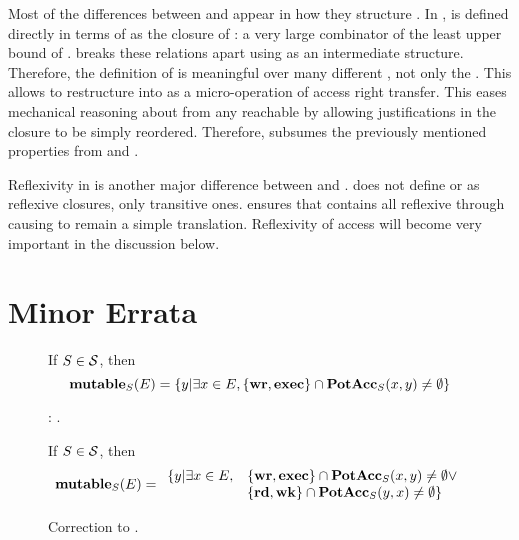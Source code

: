 Most of the differences between \TMmodelName{} and \TMSW{} appear in how they structure \TMpotAcc{}.
In \TMSW{}, \potacc{} is defined directly in terms of \diracc{} as the closure of \combine{}: a very large combinator of the least upper bound of \transaccess{}.
\TMmodelName{} breaks these relations apart using \TMaccessGraphs{} as an intermediate structure.
Therefore, the definition of \COQpotAcc{} is meaningful over many different \TMaccessGraphs{}, not only the \TMdirAccAG{}.
This allows \TMmodelName{} to restructure \transaccess{} into \COQtransfer{} as a micro-operation of access right transfer.
This eases mechanical reasoning about \TMpotAcc{} from any reachable \TMaccessGraph{} by allowing justifications in the closure to be simply reordered.
Therefore, \COQtransfer{} subsumes the previously mentioned properties from \diracc{} and \rightscpo{}.

Reflexivity in \TMpotAcc{} is another major difference between \TMSW{} and \TMmodelName{}.
\TMSW{} does not define \diracc{} or \potacc{} as reflexive closures, only transitive ones.
\TMmodelName{} ensures that \COQpotAcc{} contains all reflexive \TMaccessEdges{} through \COQtransfer{} causing \TMdirAcc{} to remain a simple translation.
Reflexivity of access will become very important in the discussion below.

\section{Minor Errata}
\label{sec:SW:errata}

\begin{figure}
If \ensuremath{S \in \stateset}, then
\[ \mathbf{mutable}_{S}(E) = \{y|\exists x \in E, \{\mathbf{wr},\mathbf{exec}\} \cap \mathbf{PotAcc}_{S}(x,y) \neq \emptyset \} \]
\caption{\modellbl{} : \mutable{}. \label{def:SW:mutable}}
\end{figure}

\begin{figure}
If \ensuremath{S \in \stateset}, then
\[ \mathbf{mutable}_{S}(E) = 
\begin{array}{ll}
  \{y | \exists x \in E, & \{\mathbf{wr}, \mathbf{exec}\} \cap \mathbf{PotAcc}_{S}(x,y) \neq \emptyset \lor \\
  & \{\mathbf{rd}, \mathbf{wk}\} \cap \mathbf{PotAcc}_{S}(y,x) \neq \emptyset  \} 
\end{array}
\]   
\caption{Correction to \mutable{}. \label{def:SW:errata:mutable}}
\end{figure}

